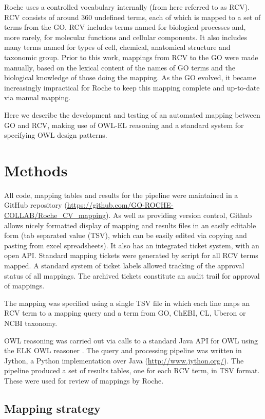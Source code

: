\documentclass[runningheads,a4paper]{llncs}
\begin{document}
{{Roche uses a controlled vocabulary internally (from here referred to as RCV).  RCV consists of around 360 undefined terms, each of which is mapped to a set of terms from the \ac{GO}. RCV includes terms named for biological processes and, more rarely, for molecular functions and cellular components.  It also includes many terms named for types of cell, chemical, anatomical structure and taxonomic group. Prior to this work, mappings from RCV to the \ac{GO} were made manually, based on the lexical content of the names of \ac{GO} terms and the biological knowledge of those doing the mapping.  As the \ac{GO} evolved, it became increasingly impractical for Roche to keep this mapping complete and up-to-date via manual mapping.

Here we describe the development and testing of an automated mapping between \ac{GO} and RCV, making use of OWL-EL reasoning and a standard system for specifying OWL design patterns.


\section{Methods}

All code, mapping tables and results for the pipeline were maintained in a GitHub repository (\url{https://github.com/GO-ROCHE-COLLAB/Roche_CV_mapping}). As well as providing version control, Github allows nicely formatted display of mapping and results files in an easily editable form (tab separated value (TSV), which can be easily edited via copying and pasting from excel spreadsheets). It also has an integrated ticket system, with an open API.  Standard mapping tickets were generated by script for all RCV terms mapped. A standard system of ticket labels allowed tracking of the approval status of all mappings.  The archived tickets constitute an audit trail for approval of mappings.

The mapping was specified using a single TSV file in which each line maps an RCV term to a mapping query and a term from \ac{GO}, ChEBI, CL, Uberon or NCBI taxonomy.

OWL reasoning was carried out via calls to a standard Java API for OWL using the ELK OWL reasoner \cite{kazakov2012}.  The query and processing pipeline was written in Jython, a Python implementation over Java (\url{http://www.jython.org/}).  The pipeline produced a set of results tables, one for each RCV term, in TSV format.  These were used for review of mappings by Roche. 

\subsection{Mapping strategy}

}}
\end{document}
